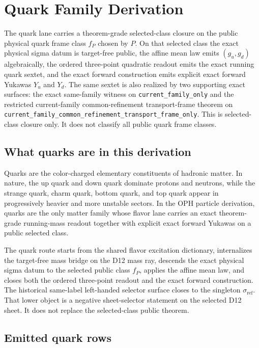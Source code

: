 \documentclass[11pt]{article}
\begin{document}
\section{Quark Family Derivation}

The quark lane carries a theorem-grade selected-class closure on the public physical quark frame
class \(f_P\) chosen by \(P\). On that selected class the exact physical sigma datum is
target-free public, the affine mean law emits \((g_u,g_d)\) algebraically, the ordered
three-point quadratic readout emits the exact running quark sextet, and the exact forward
construction emits explicit exact forward Yukawas \(Y_u\) and \(Y_d\). The same sextet is also
realized by two supporting exact surfaces: the exact same-family witness on
\texttt{current\_family\_only} and the restricted current-family common-refinement
transport-frame theorem on
\texttt{current\_family\_common\_refinement\_transport\_frame\_only}. This is selected-class
closure only. It does not classify all public quark frame classes.

\subsection{What quarks are in this derivation}

Quarks are the color-charged elementary constituents of hadronic matter. In nature, the up quark
and down quark dominate protons and neutrons, while the strange quark, charm quark, bottom
quark, and top quark appear in progressively heavier and more unstable sectors. In the OPH
particle derivation, quarks are the only matter family whose flavor lane carries an exact
theorem-grade running-mass readout together with explicit exact forward Yukawas on a public
selected class.

The quark route starts from the shared flavor excitation dictionary, internalizes the target-free
mass bridge on the D12 mass ray, descends the exact physical sigma datum to the selected public
class \(f_P\), applies the affine mean law, and closes both the ordered three-point readout and
the exact forward construction. The historical same-label left-handed selector surface closes to
the singleton \(\sigma_{\mathrm{ref}}\). That lower object is a negative sheet-selector statement
on the selected D12 sheet. It does not replace the selected-class public theorem.

\subsection{Emitted quark rows}
\end{document}
